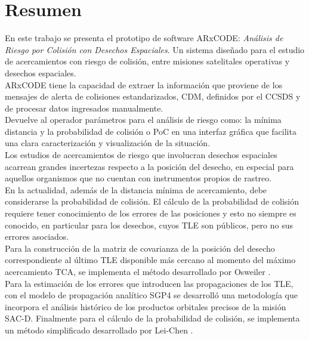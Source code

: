 \chapter*{Resumen}
\label{chap:resumen}
En este trabajo se presenta el prototipo de software ARxCODE: {\it{An\'alisis de Riesgo por Colisi\'on con Desechos Espaciales}}. Un sistema dise\~nado para el estudio de acercamientos con riesgo de colisi\'on, entre misiones satelitales operativas y desechos espaciales.\\

ARxCODE tiene la capacidad de extraer la informaci\'on que proviene de los mensajes de alerta de colisiones estandarizados, \ac{CDM}, definidos por el \ac{CCSDS} y de procesar datos ingresados manualmente.\\
Devuelve al operador par\'ametros para el an\'alisis de riesgo como: la m\'inima distancia y la probabilidad de colisi\'on  o \ac{PoC} en una interfaz gr\'afica que facilita una clara caracterizaci\'on y visualizaci\'on de la situaci\'on.\\

Los estudios de acercamientos de riesgo que involucran desechos espaciales acarrean grandes incertezas respecto a la posici\'on del desecho, en especial para aquellos organismos que no cuentan con instrumentos propios de rastreo.\\
En la actualidad, adem\'as de la distancia m\'inima de acercamiento, debe considerarse la probabilidad de colisi\'on. El c\'alculo de la probabilidad de colisi\'on requiere tener conocimiento de los errores de las posiciones y esto no siempre es conocido, en particular para los desechos, cuyos \ac{TLE} son p\'ublicos, pero no sus errores asociados.\\

Para la construcci\'on de la matriz de covarianza de la posici\'on del desecho correspondiente al \'ultimo TLE disponible m\'as cercano al momento del m\'aximo acercamiento \ac{TCA}, se implementa el m\'etodo desarrollado por Osweiler \citep{osweiler}.\\
Para la estimaci\'on de los errores que introducen las propagaciones de los TLE, con el modelo de propagaci\'on anal\'itico \ac{SGP4} se desarroll\'o una metodolog\'ia que incorpora el análisis hist\'orico de los productos orbitales precisos de la misi\'on SAC-D.
Finalmente para el c\'alculo de la probabilidad de colisi\'on, se implementa un m\'etodo simplificado desarrollado por Lei-Chen \citep{leichen}.\\


